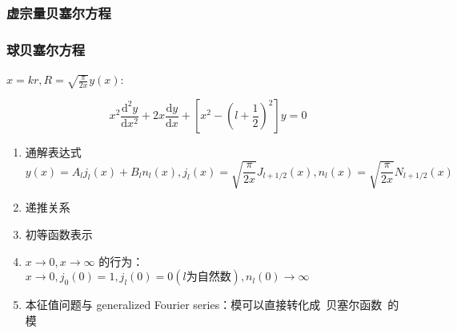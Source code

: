 \documentclass{article}
\begin{document}
\subsubsection{虚宗量贝塞尔方程}

\subsubsection{球贝塞尔方程}

$x=kr, R=\sqrt{\frac{\pi}{2x}}y(x)$:

$$x^2\frac{\mathrm{d}^2y}{\mathrm{d}x^2}+2x\frac{\mathrm{d}y}{\mathrm{d}x}+[x^2-(l+\frac{1}{2})^2]y=0$$

\begin{enumerate}
    \item 通解表达式 $$y(x)=A_lj_l(x)+B_ln_l(x), j_l(x)=\sqrt{\frac{\pi}{2x}}J_{l+1/2}(x), n_l(x)=\sqrt{\frac{\pi}{2x}}N_{l+1/2}(x)$$
    \item 递推关系
    \item 初等函数表示
    \item $x\to0,x\to\infty$ 的行为：$x\to 0, j_0(0)=1, j_l(0)=0(l为自然数), n_l(0)\to\infty$
    \item 本征值问题与 generalized Fourier series：模可以直接转化成\ 贝塞尔函数\ 的模
\end{enumerate}
\end{document}

